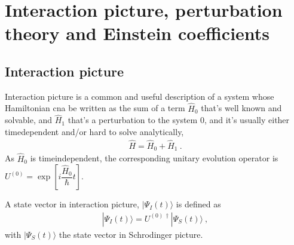 \documentclass[letterpaper,10pt,english]{jupyterBook}
\begin{document}
\sphinxstepscope


\chapter{Interaction picture, perturbation theory and Einstein coefficients}
\label{\detokenize{ch/quantum-mechanics/einstein-coeffs-interaction-picture:interaction-picture-perturbation-theory-and-einstein-coefficients}}\label{\detokenize{ch/quantum-mechanics/einstein-coeffs-interaction-picture:quantum-mechanics-einstein-coeffs-interaction-picture}}\label{\detokenize{ch/quantum-mechanics/einstein-coeffs-interaction-picture::doc}}

\section{Interaction picture}
\label{\detokenize{ch/quantum-mechanics/einstein-coeffs-interaction-picture:interaction-picture}}\label{\detokenize{ch/quantum-mechanics/einstein-coeffs-interaction-picture:quantum-mechanics-einstein-coeffs-interaction-picture-interaction}}
\sphinxAtStartPar
Interaction picture is a common and useful description of a system whose Hamiltonian cna be written as the sum of a term \(\hat{H}_0\) that’s well known and solvable, and \(\hat{H}_1\) that’s a perturbation to the system \(0\), and it’s usually either time\sphinxhyphen{}dependent and/or hard to solve analytically,
\begin{equation*}
\begin{split}\hat{H} = \hat{H}_0 + \hat{H}_1 \ .\end{split}
\end{equation*}
\sphinxAtStartPar
As \(\hat{H}_0\) is time\sphinxhyphen{}independent, the corresponding unitary evolution operator is \(U^{(0)} = \exp\left[ i \dfrac{\hat{H}_0}\hbar t \right]\).

\sphinxAtStartPar
A state vector in interaction picture, \(| \Psi_I(t) \rangle\) is defined as
\begin{equation*}
\begin{split}| \Psi_{I} (t) \rangle = U^{(0) \, \dagger} | \Psi_S(t) \rangle \ ,\end{split}
\end{equation*}
\sphinxAtStartPar
with \(| \Psi_S(t) \rangle\) the state vector in Schrodinger picture.
\end{document}
